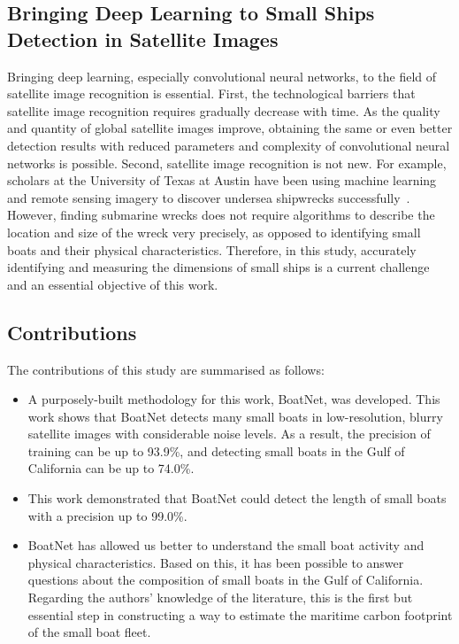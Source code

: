 \subsection{Bringing Deep Learning to Small Ships Detection in Satellite Images}
Bringing deep learning, especially convolutional neural networks, to the field of satellite image recognition is essential. First, the technological barriers that satellite image recognition requires gradually decrease with time. As the quality and quantity of global satellite images improve, obtaining the same or even better detection results with reduced parameters and complexity of convolutional neural networks is possible. Second, satellite image recognition is not new. For example, scholars at the University of Texas at Austin have been using machine learning and remote sensing imagery to discover undersea shipwrecks successfully~\cite{character2021archaeologic}. However, finding submarine wrecks does not require algorithms to describe the location and size of the wreck very precisely, as opposed to identifying small boats and their physical characteristics. Therefore, in this study, accurately identifying and measuring the dimensions of small ships is a current challenge and an essential objective of this work.


\subsection{Contributions}
The contributions of this study are summarised as follows:
\begin{itemize}
    \item A purposely-built methodology for this work, BoatNet, was developed. This work shows that BoatNet detects many small boats in low-resolution, blurry satellite images with considerable noise levels. As a result, the precision of training can be up to 93.9\%, and detecting small boats in the Gulf of California can be up to 74.0\%.

    \item This work demonstrated that BoatNet could detect the length of small boats with a precision up to 99.0\%.

    \item BoatNet has allowed us better to understand the small boat activity and physical characteristics. Based on this, it has been possible to answer questions about the composition of small boats in the Gulf of California. Regarding the authors' knowledge of the literature, this is the first but essential step in constructing a way to estimate the maritime carbon footprint of the small boat fleet.
\end{itemize}